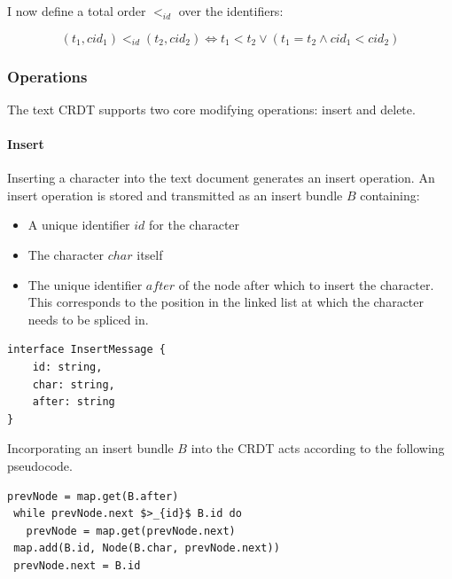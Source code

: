 \documentclass[12pt,a4paper,twoside,openright]{report}
\begin{document}
		I now define a total order $<_{id}$ over the identifiers:
		
		\[(t_1, cid_1) <_{id} (t_2, cid_2) \Leftrightarrow t_1 < t_2 \lor (t_1 = t_2 \land cid_1 < cid_2)\]
		
		
		\subsubsection{Operations}
		The text CRDT supports two core modifying operations: insert and delete.
		
			\paragraph{Insert}
				Inserting a character into the text document generates an insert operation. An insert operation is stored and transmitted as an insert bundle $B$ containing: 
				\begin{itemize}
					\item A unique identifier $id$ for the character
					\item The character $char$ itself
					\item The unique identifier $after$ of the node after which to insert the character. This corresponds to the position in the linked list at which the character needs to be spliced in.
				\end{itemize}
			
\vspace{3mm}	
\begin{lstlisting}[caption=Insert Bundle Type Signature]
interface InsertMessage {
    id: string,
    char: string,
    after: string
}
\end{lstlisting}
				
				Incorporating an insert bundle $B$ into the CRDT acts according to the following pseudocode.
				
\begin{lstlisting}[mathescape=true,caption=Incorporating Insert Bundle into CRDT]
 prevNode = map.get(B.after)
 while prevNode.next $>_{id}$ B.id do
   prevNode = map.get(prevNode.next)
 map.add(B.id, Node(B.char, prevNode.next))
 prevNode.next = B.id
\end{lstlisting}
				
\end{document}
